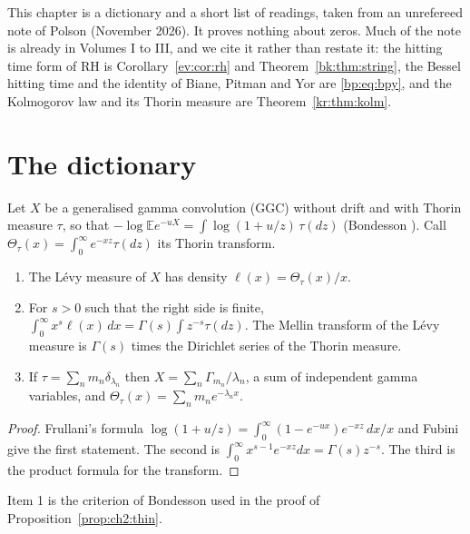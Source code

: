 \label{mt:ch:meta}
This chapter is a dictionary and a short list of readings, taken from an unrefereed note of Polson (November 2026). It proves nothing about zeros. Much of the note is already in Volumes I to III, and we cite it rather than restate it: the hitting time form of RH is Corollary~\ref{ev:cor:rh} and Theorem~\ref{bk:thm:string}, the Bessel hitting time and the identity of Biane, Pitman and Yor are \eqref{bp:eq:bpy}, and the Kolmogorov law and its Thorin measure are Theorem~\ref{kr:thm:kolm}.

\section{The dictionary}\label{mt:sec:dict}
Let $X$ be a generalised gamma convolution (GGC) without drift and with Thorin measure $\tau$, so that $-\log\mathbb Ee^{-uX}=\int\log(1+u/z)\,\tau(dz)$ (Bondesson \cite{Bondesson}). Call $\Theta_\tau(x)=\int_0^\infty e^{-xz}\tau(dz)$ its Thorin transform.
\begin{proposition}\label{mt:prop:dict}
\begin{enumerate}
\item The L\'evy measure of $X$ has density $\ell(x)=\Theta_\tau(x)/x$.
\item For $s>0$ such that the right side is finite, $\int_0^\infty x^{s}\ell(x)\,dx=\Gamma(s)\int z^{-s}\tau(dz)$. The Mellin transform of the L\'evy measure is $\Gamma(s)$ times the Dirichlet series of the Thorin measure.
\item If $\tau=\sum_nm_n\delta_{\lambda_n}$ then $X=\sum_n\Gamma_{m_n}/\lambda_n$, a sum of independent gamma variables, and $\Theta_\tau(x)=\sum_nm_ne^{-\lambda_nx}$.
\end{enumerate}
\end{proposition}
\begin{proof}
Frullani's formula $\log(1+u/z)=\int_0^\infty(1-e^{-ux})e^{-xz}\,dx/x$ and Fubini give the first statement. The second is $\int_0^\infty x^{s-1}e^{-xz}dx=\Gamma(s)z^{-s}$. The third is the product formula for the transform.
\end{proof}
Item 1 is the criterion of Bondesson used in the proof of Proposition~\ref{prop:ch2:thin}.%

